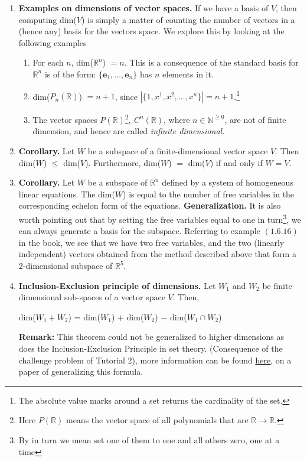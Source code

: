 \documentclass[oneside, 12pt]{book}
\newcommand{\settag}[1]{\renewcommand{\theenumi}{#1}}
\newcommand{\R}{\mathbb{R}}
\newcommand{\tbf}[1]{\textbf{#1}}
\newcommand{\tit}[1]{\textit{#1}}
\begin{document}
\begin{enumerate}
        \settag{1.6.13}
        \item \tbf{Examples on dimensions of vector spaces. }If we have a basis of $V$, then computing dim($V$) is simply a matter of counting the number of vectors in a (hence any) basis for the vectors space. We explore this by looking at the following examples
        \begin{enumerate}
            \item For each $n$, dim($\R^n$) $=n$. This is a consequence of the standard basis for $\R^n$ is of the form: $\{\mathbf{e}_1, \ldots, \mathbf{e}_n\}$ has $n$ elements in it.
            \item dim($P_n(\R)$) $=n+1$, since $|\{1, x^1, x^2, \ldots, x^n\}|=n+1$.\footnote{The absolute value marks around a set returns the cardinality of the set.}
            \item The vector spaces $P(\R)$\footnote{Here $P(\R)$ means the vector space of all polynomials that are $\R \xrightarrow{} \R$.}$,~C^n(\R)$, where $n\in \mathbb{N}^{\geq 0}$, are not of finite dimension, and hence are called \tit{infinite dimensional}.
        \end{enumerate}
        
        \settag{1.6.14}
        \item \tbf{Corollary. }Let $W$ be a subspace of a finite-dimensional vector space $V$. Then dim($W$) $\leq$ dim($V$). Furthermore, dim($W$) $=$ dim($V$) if and only if $W=V$.
        
        \settag{1.6.15}
        \item \tbf{Corollary. }Let $W$ be a subspace of $\R^n$ defined by a system of homogeneous linear equations. The dim($W$) is equal to the number of free variables in the corresponding echelon form of the equations.\newline
        \tbf{Generalization.} It is also worth pointing out that by setting the free variables equal to one in turn\footnote{By in turn we mean set one of them to one and all others zero, one at a time}, we can always generate a basis for the subspace. Referring to example $(1.6.16)$ in the book, we see that we have two free variables, and the two (linearly independent) vectors obtained from the method described above that form a 2-dimensional subspace of $\R^5$. 
        
        
        \settag{1.6.18}
        \item \tbf{Inclusion-Exclusion principle of dimensions.} Let $W_1$ and $W_2$ be finite dimensional sub-spaces of a vector space $V$. Then,
        \begin{center}
            dim($W_1+W_2$) = dim($W_1$) $+$ dim($W_2$) $-$ dim($W_1\cap W_2$)
        \end{center}
        \tbf{Remark:} This theorem could not be generalized to higher dimensions as does the Inclusion-Exclusion Principle in set theory. (Consequence of the challenge problem of Tutorial 2), more information can be found \href{https://www.jstor.org/stable/24337937?seq=1#metadata_info_tab_contents}{\underline{here}}, on a paper of generalizing this formula. 
        
    \end{enumerate}
    
\end{document}
